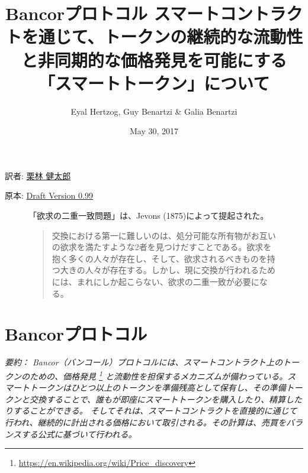 \documentclass{jsarticle}
\begin{document}
\title{
  \textbf{Bancorプロトコル}
  \protect\linebreak
  \protect\linebreak
  \large
  スマートコントラクトを通じて、トークンの継続的な流動性と非同期的な価格発見を可能にする「スマートトークン」について
}

\author{Eyal Hertzog, Guy Benartzi \& Galia Benartzi}
\date{May 30, 2017}

\maketitle

\begin{center}
  \item[訳者:] \href{https://kentarok.org}{栗林 健太郎}
  \item[原本:] \href{http://www.hyuki.com/girl/}{Draft Version 0.99}
\end{center}

\begin{figure}[b]
  「欲求の二重一致問題」は、Jevons (1875)によって提起された。

  \begin{quotation}  
    交換における第一に難しいのは、処分可能な所有物がお互いの欲求を満たすような2者を見つけだすことである。欲求を抱く多くの人々が存在し、そして、欲求されるべきものを持つ大きの人々が存在する。しかし、現に交換が行われるためには、まれにしか起こらない、欲求の二重一致が必要になる。
  \end{quotation}
\end{figure}

\newpage
\setcounter{tocdepth}{3}
\tableofcontents
\newpage

\section{Bancorプロトコル}

\emph{
  要約： Bancor（バンコール）プロトコルには、スマートコントラクト上のトークンのための、価格発見
  \footnote{\url{https://en.wikipedia.org/wiki/Price_discovery}}
  と流動性を担保するメカニズムが備わっている。スマートトークンはひとつ以上のトークンを準備残高として保有し、その準備トークンと交換することで、誰もが即座にスマートトークンを購入したり、精算したりすることができる。 そしてそれは、スマートコントラクトを直接的に通じて行われ、継続的に計出される価格において取引される。その計算は、売買をバランスする公式に基づいて行われる。
} \\
\end{document}
